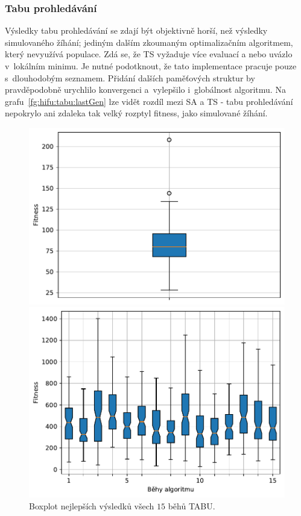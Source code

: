 \subsubsection{Tabu prohledávání}
Výsledky tabu prohledávání se zdají být objektivně horší, než výsledky simulovaného žíhání; jediným dalším zkoumaným optimalizačním algoritmem, který nevyužívá populace. Zdá se, že TS vyžaduje více evaluací a nebo uvázlo v~lokálním minimu. Je nutné podotknout, že tato implementace pracuje pouze s~dlouhodobým seznamem. Přidání dalších paměťových struktur by pravděpodobně urychlilo konvergenci a~vylepšilo i~globálnost algoritmu. Na grafu~\ref{fg:hifu:tabu:lastGen} lze vidět rozdíl mezi SA a TS - tabu prohledávání nepokrylo ani zdaleka tak velký rozptyl fitness, jako simulované žíhání. 

\begin{figure}[H]
\begin{minipage}[t]{0.475\linewidth}
\includegraphics[width=\linewidth]{obrazky-figures/statistics/HIFU/blob/4/TABU/bestsBoxplot_WithOutliers.pdf}
\caption{Boxplot nejlepších výsledků všech $15$ běhů TABU.}
\label{fg:hifu:tabu:best}
\end{minipage}
\hfill
\begin{minipage}[t]{0.475\linewidth}
\includegraphics[width=\linewidth]{obrazky-figures/statistics/HIFU/blob/4/TABU/lastGenBoxplots.pdf}

\end{minipage}
\end{figure}
